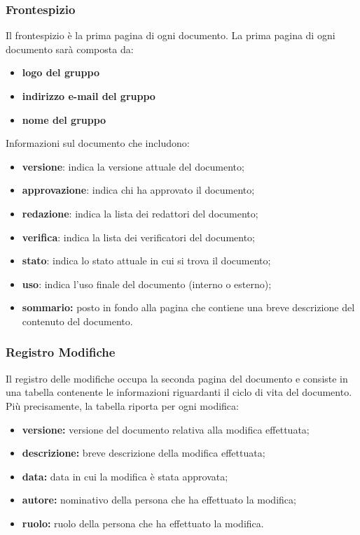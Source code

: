 \subsubsection{Frontespizio}\label{3.1.7.1}
Il frontespizio è la prima pagina di ogni documento.
La prima pagina di ogni documento sarà composta da:
\begin{itemize}
	\item \textbf{logo del gruppo}
		\item \textbf{indirizzo e-mail del gruppo}
			\item \textbf{nome del gruppo}
\end{itemize}
Informazioni sul documento che includono:
\begin{itemize}
	\item \textbf{versione}: indica la versione attuale del documento;
		\item \textbf{approvazione}: indica chi ha approvato il documento;
			\item \textbf{redazione}: indica la lista dei redattori del documento;
				\item \textbf{verifica}: indica la lista dei verificatori del documento;
					\item \textbf{stato}: indica lo stato attuale in cui si trova il documento;
						\item \textbf{uso}: indica l’uso finale del documento (interno o esterno);
							\item \textbf{sommario:} posto in fondo alla pagina che contiene una breve descrizione del contenuto del documento.
\end{itemize}
\subsubsection{Registro Modifiche}\label{3.1.7.2}
Il registro delle modifiche occupa la seconda pagina del documento e consiste in una tabella contenente le informazioni riguardanti il ciclo di vita del documento.
\\Più precisamente, la tabella riporta per ogni modifica:
\begin{itemize}
\item \textbf{versione:} versione del documento relativa alla modifica effettuata;
	\item \textbf{descrizione:} breve descrizione della modifica effettuata;
		\item \textbf{data:} data in cui la modifica è stata approvata;
			\item \textbf{autore:} nominativo della persona che ha effettuato la modifica;
				\item \textbf{ruolo:} ruolo della persona che ha effettuato la modifica.
\end{itemize}
